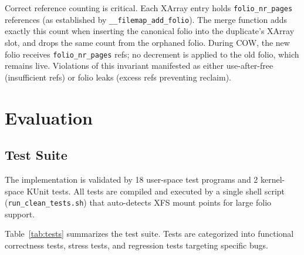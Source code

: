 \documentclass[conference]{IEEEtran}
\begin{document}
Correct reference counting is critical. Each XArray entry holds \texttt{folio\_nr\_pages} references (as established by \texttt{\_\_filemap\_add\_folio}). The merge function adds exactly this count when inserting the canonical folio into the duplicate's XArray slot, and drops the same count from the orphaned folio. During COW, the new folio receives \texttt{folio\_nr\_pages} refs; no decrement is applied to the old folio, which remains live. Violations of this invariant manifested as either use-after-free (insufficient refs) or folio leaks (excess refs preventing reclaim).

\section{Evaluation}
\label{sec:eval}

\subsection{Test Suite}

The implementation is validated by 18 user-space test programs and 2 kernel-space KUnit tests. All tests are compiled and executed by a single shell script (\texttt{run\_clean\_tests.sh}) that auto-detects XFS mount points for large folio support.

Table~\ref{tab:tests} summarizes the test suite. Tests are categorized into functional correctness tests, stress tests, and regression tests targeting specific bugs.
\end{document}
